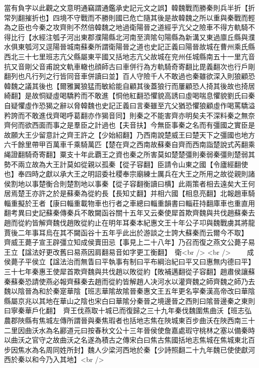 當有負字以此觀之文意明通竊謂通鑑承史記元文之誤】韓魏戰而勝秦則兵半折【折常列翻摧折也】四境不守戰而不勝則國已危亡隨其後是故韓魏之所以重與秦戰而輕為之臣也今秦之攻齊則不然倍韓魏之地過衛陽晉之道經乎亢父之險車不得方軌騎不得比行【水經注瓠子河出東郡濮陽縣北河南至濟隂句陽縣為新溝又東過廪丘縣與濮水俱東瓠河又逕陽晉城南蘇秦所謂衛陽晉之道也史記正義曰陽晉故城在曹州乘氏縣西北三十七里班志亢父縣屬東平國又括地志亢父故城在兖州任城縣南五十一里亢音抗又音剛父音甫說文軌車轍也顔師古曰車併行為方軌騎奇寄翻比毘義翻次也行戶剛翻列也凡行列之行皆同音車併讀曰並】百人守險千人不敢過也秦雖欲深入則狼顧恐韓魏之議其後也【爾雅翼狼猛而敏給能自顧其後蓋狼行而屢顧恐人掎其後故也掎居綺翻】是故恫疑虛喝驕矜而不敢進【恫他紅翻恐懼貌高誘曰虛喝喘息懼貌劉氏曰秦自疑懼虛作恐猲之辭以脅韓魏也史記正義曰言秦雖至亢父猶恐懼狼顧虛作喝罵驕溢矜誇而不敢進伐齊喝呼葛翻亦作猲音同】則秦之不能害齊亦明矣夫不深料秦之無奈齊何而欲西面而事之是羣臣之計過也【夫音扶】今無臣事秦之名而有彊國之實臣是故願大王少留意計之齊王許之【少始紹翻】乃西南說楚威王曰楚天下之彊國也地方六千餘里帶甲百萬車千乘騎萬匹【楚在齊之西南故蘇秦自齊而西南詣楚說式芮翻乘䋲證翻騎奇寄翻】粟支十年此覇王之資也秦之所害莫如楚楚彊則秦弱秦彊則楚弱其勢不兩立故為大王計莫如從親以孤秦【從子容翻】臣請令山東之國【令廬經翻使也】奉四時之獻以承大王之明詔委社稷奉宗廟練士厲兵在大王之所用之故從親則諸侯割地以事楚衡合則楚割地以事秦【從子容翻衡讀曰横】此兩策者相去遠矣大王何居焉楚王亦許之於是蘇秦為從約長【長知丈翻】并相六國【相息亮翻】北報趙車騎輜重擬於王者【康曰輜重載物車也行者之車總曰輜重韻書曰輜莊持翻庫車也重直用翻考異曰史記蘇秦傳秦兵不敢闚函谷關十五年又云秦使犀首欺齊魏與共伐趙蘇秦去趙而從約皆解齊魏伐趙敗從約止在明年耳秦本紀惠文王十年公子卭與魏戰虜其將龍賈後二年事耳烏在其不闚函谷十五年乎此出於游談之士誇大蘇秦而云爾今不取】　齊威王薨子宣王辟彊立知成侯賣田忌【事見上二十八年】乃召而復之燕文公薨子易王立【諡法好更改舊曰易燕因肩翻易音如字更工衡翻】　衛<br />
<br />
　　成侯薨子平侯立【諡法治而無眚曰平執事有制曰平布綱治紀曰平又曰惠無内德曰平】三十七年秦惠王使犀首欺齊魏與共伐趙以敗從約【敗補邁翻從子容翻】趙肅侯讓蘇秦蘇秦恐請使燕必報齊蘇秦去趙而從約皆解趙人决河水以灌齊魏之師齊魏之師乃去　魏以陰晉為和於秦寔華陰【班志華隂故隂晉秦惠文王五年更名寜秦漢高帝改曰華陰縣屬京兆以其地在華山之陰也宋白曰華隂分秦晉之境邊晉之西則曰隂晉邊秦之東則曰寧秦華戶化翻】　齊王伐燕取十城已而復歸之三十九年秦伐魏圍焦曲沃【班志弘農郡陜縣有焦城左傳所謂晉與秦焦瑕者也括地志焦在陜城東百步曲沃在陜西南三十二里因曲沃水為名酈道元曰按春秋文公十三年晉侯使詹嘉處瑕守桃林之塞以備秦時以曲沃之官守之故曲沃之名遂為積古之傳宋白曰焦古焦國括地志焦城在焦城東北百步因焦水為名周同姓所封】魏人少梁河西地於秦【少詩照翻二十九年魏已使使獻河西於秦以和今乃入其地】<br />
